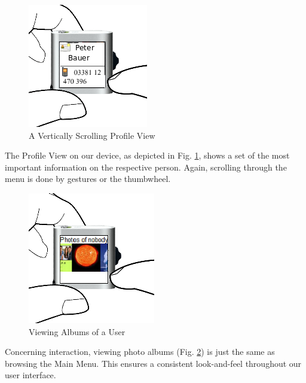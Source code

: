\begin{figure}[h]
  \begin{center}
    \includegraphics[width=0.6\linewidth]{imgs/wt4.png}
  \end{center}
  \caption{A Vertically Scrolling Profile View}
  \label{fig:wt4}
\end{figure}
%
The Profile View on our device, as depicted in Fig. \ref{fig:wt4}, shows a set of the most important information on the respective person. Again, scrolling through the menu is done by gestures or the thumbwheel.\\
%
\begin{figure}[h!]
  \begin{center}
    \includegraphics[width=0.6\linewidth]{imgs/wt5.png}
  \end{center}
  \caption{Viewing Albums of a User}
  \label{fig:wt5}
\end{figure}
%
Concerning interaction, viewing photo albums (Fig. \ref{fig:wt5}) is just the same as browsing the Main Menu. This ensures a consistent look-and-feel throughout our user interface.

